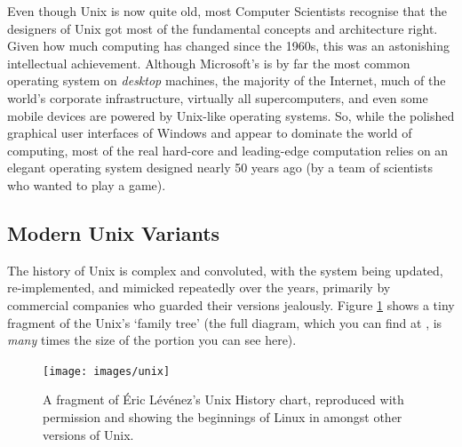 
Even though Unix is now quite old, most Computer Scientists recognise that the designers of Unix got most of the fundamental concepts and
architecture right. Given how much computing has changed since the 1960s, this was an astonishing intellectual achievement. Although Microsoft's  is by far the most common operating system on \emph{desktop} machines, the majority of the Internet, much of the world's corporate infrastructure, virtually all supercomputers, and even some mobile devices are powered by Unix-like operating systems. So, while the polished graphical user interfaces of Windows and  appear to dominate the world of computing, most of the real hard-core and leading-edge computation relies on an elegant operating system designed nearly 50 years ago (by a team of scientists who wanted to play a game).

\subsection{Modern Unix Variants}
\label{sec:modern-unix-variants}


The history of Unix is complex and convoluted, with the system being updated, re-implemented, and mimicked repeatedly over the years, primarily by commercial companies who guarded their versions jealously. Figure \ref{fig:unix-history} shows a tiny fragment of the Unix's `family tree' (the full diagram, which you can find at , is \emph{many} times the size of the portion you can see here).

\begin{figure}
  \begin{center}
    \texttt{[image: images/unix]}
  \end{center}
\caption{A fragment of \'{E}ric L\'{e}v\'{e}nez's Unix History chart, reproduced with permission and showing the beginnings of Linux in amongst other versions of Unix.}
\label{fig:unix-history}
\end{figure}

